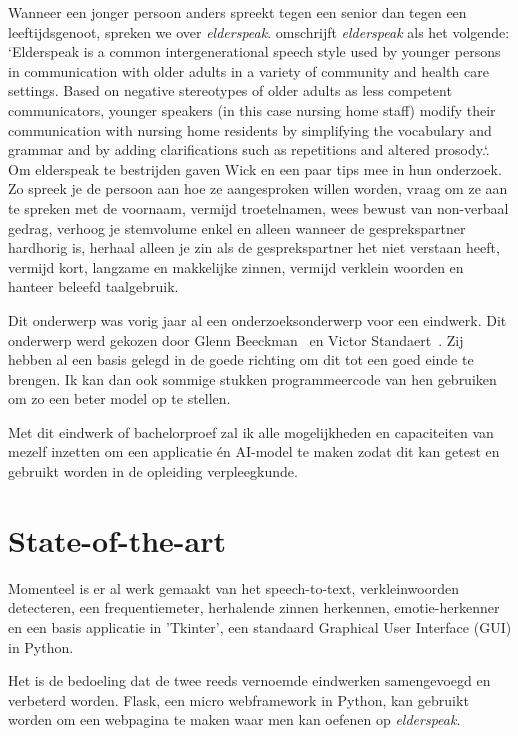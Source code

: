 \documentclass{hogent-article}
\begin{document}
Wanneer een jonger persoon anders spreekt tegen een senior dan tegen een leeftijdsgenoot, spreken we over \textit{elderspeak}. \textcite{Williams2011} omschrijft \textit{elderspeak} als het volgende: `Elderspeak is a common intergenerational speech style used by younger persons in communication with older adults in a variety of community and health care settings. Based on negative stereotypes of older adults as less competent communicators, younger speakers (in this case nursing home staff) modify their communication with nursing home residents by simplifying the vocabulary and grammar and by adding clarifications such as repetitions and altered prosody.`. Om elderspeak te bestrijden gaven Wick en \textcite{Wick2007} een paar tips mee in hun onderzoek. Zo spreek je de persoon aan hoe ze aangesproken willen worden, vraag om ze aan te spreken met de voornaam, vermijd troetelnamen, wees bewust van non-verbaal gedrag, verhoog je stemvolume enkel en alleen wanneer de gesprekspartner hardhorig is, herhaal alleen je zin als de gesprekspartner het niet verstaan heeft, vermijd kort, langzame en makkelijke zinnen, vermijd verklein woorden en hanteer beleefd taalgebruik.

Dit onderwerp was vorig jaar al een onderzoeksonderwerp voor een eindwerk. Dit onderwerp werd gekozen door Glenn Beeckman~\autocite{Beeckman2021} en Victor Standaert~\autocite{Standaert2021}. Zij hebben al een basis gelegd in de goede richting om dit tot een goed einde te brengen. Ik kan dan ook sommige stukken programmeercode van hen gebruiken om zo een beter model op te stellen.

Met dit eindwerk of bachelorproef zal ik alle mogelijkheden en capaciteiten van mezelf inzetten om een applicatie én AI-model te maken zodat dit kan getest en gebruikt worden in de opleiding verpleegkunde.

\section{State-of-the-art}\label{sec:state-of-the-art}
Momenteel is er al werk gemaakt van het speech-to-text, verkleinwoorden detecteren, een frequentiemeter, herhalende zinnen herkennen, emotie-herkenner en een basis applicatie in 'Tkinter', een standaard Graphical User Interface (GUI) in Python.

Het is de bedoeling dat de twee reeds vernoemde eindwerken samengevoegd en verbeterd worden. Flask, een micro webframework in Python, kan gebruikt worden om een webpagina te maken waar men kan oefenen op \textit{elderspeak}.
\end{document}
